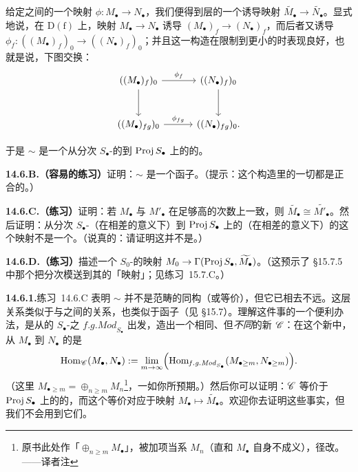 给定\trGradedModule{}之间的一个映射 $\phi\colon M_\bullet\to N_\bullet$，我们便得到层的一个诱导映射 $\widetilde{M_\bullet}\to\widetilde{N_\bullet}$。显式地说，在 $\mathrm{D}(\mathrm{f})$ 上，映射 $M_\bullet\to N_\bullet$ 诱导 $(M_\bullet)_f\to(N_\bullet)_f$，而后者又诱导 $\phi_f\colon((M_\bullet)_f)_0\to((N_\bullet)_f)_0$；并且这一构造在限制到更小的\trDistinguishedOpen{}时表现良好，也就是说，下图交换：
\[
\begin{tikzcd}[row sep=2.8em, column sep=3em]
((M_\bullet)_f)_0 \ar[r, "\phi_f"] \ar[d] & ((N_\bullet)_f)_0 \ar[d] \\
((M_\bullet)_{fg})_0 \ar[r, "\phi_{fg}"] & {((N_\bullet)_{fg})_0.}
\end{tikzcd}
\]

于是 $\sim$ 是一个从分次 $S_\bullet$-\trModule{}的\trCategory{}到 $\operatorname{Proj} S_\bullet$ 上\trQCSheaf{}的\trCategory{}的\trFunctor。

\textbf{14.6.B.（容易的练习）}\quad 证明：$\sim$ 是一个\trExact{}函子。（提示：这个构造里的一切都是正合的。）

\textbf{14.6.C.（练习）}\quad 证明：若 $M_\bullet$ 与 $M'_\bullet$ 在足够高的次数上一致，则 $\widetilde{M_\bullet}\cong\widetilde{M'_\bullet}$。然后证明：从分次 $S_\bullet$-\trModule（在相差\trIsomorphism{}的意义下）到 $\operatorname{Proj} S_\bullet$ 上的\trQCSheaf（在相差\trIsomorphism{}的意义下）的这个映射不是一个\trBijection。（说真的：请证明这并不是\trEquivalenceOfCategories。）

\textbf{14.6.D.（练习）}\quad 描述一个 $S_0$-\trModule{}的映射 $M_0\to\Gamma(\operatorname{Proj} S_\bullet,\widetilde{M_\bullet})$。（这预示了 \S15.7.5 中那个把分次模送到其\trSaturation{}的「\trSaturation{}映射」；见\mbox{练习~15.7.C}。）

\textbf{14.6.1.}\quad \mbox{练习~14.6.C} 表明 $\sim$ 并不是范畴的同构（或等价），但它已相去不远。这层关系类似于\trPresheaf{}与\trSheaf{}之间的关系，也类似于\trSheafification{}函子（见 \S15.7）。理解这件事的一个便利办法，是从\trFinitelyGenerated{}的 $S_\bullet$-\trModule{}之\trCategory{} $\mathit{f.g.Mod}_{S_\bullet}$ 出发，造出一个\trObject{}相同、但\trMorphism{}\emph{不同}的新\trCategory{} $\mathscr{C}$：在这个新\trCategory{}中，从 $M_\bullet$ 到 $N_\bullet$ 的\trMorphism{}是
\[
\operatorname{Hom}_{\mathscr{C}}(M_\bullet,N_\bullet):=\lim_{m\to\infty}\Bigl(\operatorname{Hom}_{\mathit{f.g.Mod}_{S_\bullet}}(M_{\bullet\ge m},N_{\bullet\ge m})\Bigr).
\]
（这里 $M_{\bullet\ge m}=\oplus_{n\ge m}M_n$\footnote{原书此处作「$\oplus_{n\ge m}M_\bullet$」，被加项当系 $M_n$（直和 $M_\bullet$ 自身不成义），径改。——译者注}，一如你所预期。）然后你可以证明：$\mathscr{C}$ 等价于 $\operatorname{Proj} S_\bullet$ 上\trFiniteType{}的\trQCSheaf{}的\trCategory，而这个等价对应于映射 $M_\bullet\mapsto\widetilde{M_\bullet}$。欢迎你去证明这些事实，但我们不会用到它们。

